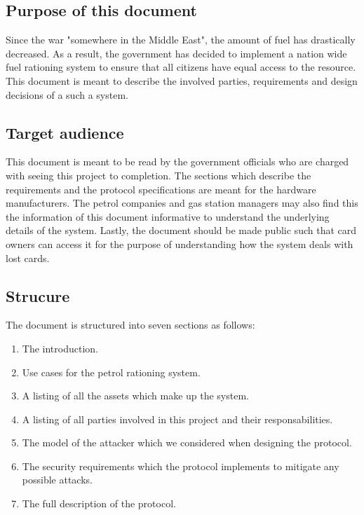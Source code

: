 \subsection{Purpose of this document}

Since the war "somewhere in the Middle East", the amount of fuel has drastically decreased. As a result, the government has decided to implement a nation wide fuel rationing system to ensure that all citizens have equal access to the resource. This document is meant to describe the involved parties, requirements and design decisions of a such a system. 

\subsection{Target audience}

This document is meant to be read by the government officials who are charged with seeing this project to completion. The sections which describe the requirements and the protocol specifications are meant for the hardware manufacturers. The petrol companies and gas station managers may also find this the information of this document informative to understand the underlying details of the system. Lastly, the document should be made public such that card owners can access it for the purpose of understanding how the system deals with lost cards.

\subsection{Strucure}

The document is structured into seven sections as follows:
\begin{enumerate}
  \item The introduction.
  \item Use cases for the petrol rationing system.
  \item A listing of all the assets which make up the system.
  \item A listing of all parties involved in this project and their responsabilities.
  \item The model of the attacker which we considered when designing the protocol.
  \item The security requirements which the protocol implements to mitigate any possible attacks.
  \item The full description of the protocol.
\end{enumerate}